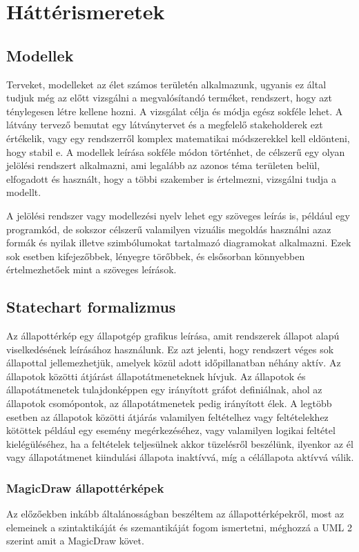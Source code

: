 \chapter{Háttérismeretek}
\section{Modellek}
Terveket, modelleket az élet számos területén alkalmazunk, ugyanis ez által tudjuk még az előtt vizsgálni a megvalósítandó terméket, rendszert, hogy azt ténylegesen létre kellene hozni. A vizsgálat célja és módja egész sokféle lehet. A látvány tervező bemutat egy látványtervet és a megfelelő stakeholderek ezt értékelik, vagy egy rendszerről komplex matematikai módszerekkel kell eldönteni, hogy stabil e. A modellek leírása sokféle módon történhet, de célszerű egy olyan jelölési rendszert alkalmazni, ami legalább az azonos téma területen belül, elfogadott és használt, hogy a többi szakember is értelmezni, vizsgálni tudja a modellt.

A jelölési rendszer vagy modellezési nyelv lehet egy szöveges leírás is, például egy programkód, de sokszor célszerű valamilyen vizuális megoldás használni azaz formák és nyilak illetve  szimbólumokat tartalmazó diagramokat alkalmazni. Ezek sok esetben kifejezőbbek, lényegre törőbbek, és elsősorban könnyebben értelmezhetőek mint a szöveges leírások.

\section{Statechart formalizmus}
Az állapottérkép egy állapotgép grafikus leírása, amit rendszerek állapot alapú viselkedésének leírásához használunk. Ez azt jelenti, hogy rendszert véges sok állapottal jellemezhetjük, amelyek közül adott időpillanatban néhány aktív. Az állapotok közötti átjárást állapotátmeneteknek hívjuk. Az állapotok és állapotátmenetek tulajdonképpen egy irányított gráfot definiálnak, ahol az állapotok csomópontok, az állapotátmenetek pedig irányított élek. A legtöbb esetben az állapotok közötti átjárás valamilyen feltételhez vagy feltételekhez kötöttek például egy esemény megérkezéséhez, vagy valamilyen logikai feltétel kielégüléséhez, ha a feltételek teljesülnek akkor tüzelésről beszélünk, ilyenkor az él vagy állapotátmenet kiindulási állapota inaktívvá, míg a célállapota aktívvá válik.

\subsection{MagicDraw állapottérképek}
Az előzőekben inkább általánosságban beszéltem az állapottérképekről, most az elemeinek a szintaktikáját és szemantikáját fogom ismertetni, méghozzá a UML 2 szerint amit a MagicDraw követ.

